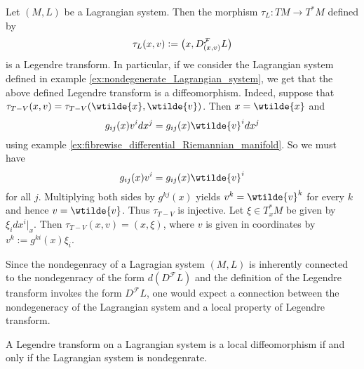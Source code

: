 \begin{example}
	\label{ex:Legendre_transform_Riemannian_manifold}
	Let $(M,L)$ be a Lagrangian system. Then the morphism $\tau_L : TM \to T^*M$ defined by
	\begin{equation}
		\label{eq:Legendre_transform}
		\tau_L(x,v) := \del[1]{x,D^\mathcal{F}_{(x,v)}L}
	\end{equation}
	\noindent is a Legendre transform. In particular, if we consider the Lagrangian system defined in example \ref{ex:nondegenerate_Lagrangian_system}, we get that the above defined Legendre transform is a diffeomorphism. Indeed, suppose that $\tau_{T - V}(x,v) = \tau_{T - V}(\wtilde{x},\wtilde{v})$. Then $x = \wtilde{x}$ and
	\begin{equation*}
		g_{ij}(x)v^idx^j = g_{ij}(x)\wtilde{v}^idx^j	
	\end{equation*}
	\noindent using example \ref{ex:fibrewise_differential_Riemannian_manifold}. So we must have
	\begin{equation*}
		g_{ij}(x)v^i = g_{ij}(x)\wtilde{v}^i
	\end{equation*}
	\noindent for all $j$. Multiplying both sides by $g^{kj}(x)$ yields $v^k = \wtilde{v}^k$ for every $k$ and hence $v = \wtilde{v}$. Thus $\tau_{T - V}$ is injective. Let $\xi \in T^*_xM$ be given by $\xi_i dx^i\vert_x$. Then $\tau_{T - V}(x,v) = (x,\xi)$, where $v$ is given in coordinates by $v^k := g^{ki}(x)\xi_i$.
\end{example} 

Since the nondegenracy of a Lagragian system $(M,L)$ is inherently connected to the nondegenracy of the form $d(D^\mathcal{F}L)$ and the definition of the Legendre transform invokes the form $D^\mathcal{F}L$, one would expect a connection between the nondegeneracy of the Lagrangian system and a local property of Legendre transform.

\begin{lemma}
	\label{lem:local_diffeomorphism}
	A Legendre transform on a Lagrangian system is a local diffeomorphism if and only if the Lagrangian system is nondegenrate.	
\end{lemma}


